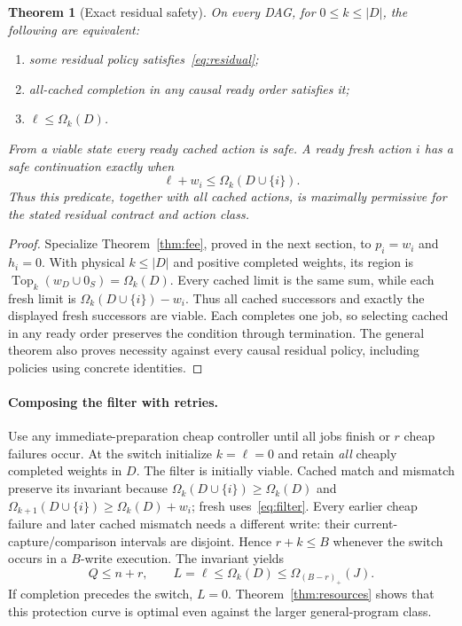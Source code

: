 \documentclass[acmsmall,screen,review,anonymous]{acmart}
\newtheorem{theorem}{Theorem}
\begin{document}
\begin{theorem}[Exact residual safety]
\label{thm:residual}
On every DAG, for $0\le k\le|D|$, the following are equivalent:
\begin{enumerate}
\setlength{\itemsep}{0pt}
\item some residual policy satisfies~\eqref{eq:residual};
\item all-cached completion in any causal ready order satisfies it;
\item $\ell\le\Omega_k(D)$.
\end{enumerate}
From a viable state every ready cached action is safe. A ready fresh action $i$ has a safe continuation exactly when
\begin{equation}
 \ell+w_i\le\Omega_k(D\cup\{i\}).
 \label{eq:filter}
\end{equation}
Thus this predicate, together with all cached actions, is maximally permissive for the stated residual contract and action class.
\end{theorem}
\begin{proof}
Specialize Theorem~\ref{thm:fee}, proved in the next section, to $p_i=w_i$ and $h_i=0$. With physical $k\le|D|$ and positive completed weights, its region is $\operatorname{Top}_k(w_D\cup0_S)=\Omega_k(D)$. Every cached limit is the same sum, while each fresh limit is $\Omega_k(D\cup\{i\})-w_i$. Thus all cached successors and exactly the displayed fresh successors are viable. Each completes one job, so selecting cached in any ready order preserves the condition through termination. The general theorem also proves necessity against every causal residual policy, including policies using concrete identities.
\end{proof}

\paragraph{Composing the filter with retries.}
Use any immediate-preparation cheap controller until all jobs finish or $r$ cheap failures occur. At the switch initialize $k=\ell=0$ and retain \emph{all} cheaply completed weights in $D$. The filter is initially viable. Cached match and mismatch preserve its invariant because $\Omega_k(D\cup\{i\})\ge\Omega_k(D)$ and $\Omega_{k+1}(D\cup\{i\})\ge\Omega_k(D)+w_i$; fresh uses~\eqref{eq:filter}. Every earlier cheap failure and later cached mismatch needs a different write: their current-capture/comparison intervals are disjoint. Hence $r+k\le B$ whenever the switch occurs in a $B$-write execution. The invariant yields
\[
 Q\le n+r,\qquad
 L=\ell\le\Omega_k(D)\le\Omega_{(B-r)_+}(J).
\]
If completion precedes the switch, $L=0$. Theorem~\ref{thm:resources} shows that this protection curve is optimal even against the larger general-program class.
\end{document}
